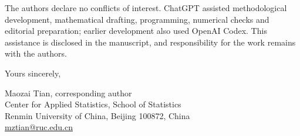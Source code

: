 \documentclass[11pt,a4paper]{article}
\begin{document}
The authors declare no conflicts of interest. ChatGPT assisted methodological development, mathematical drafting, programming, numerical checks and editorial preparation; earlier development also used OpenAI Codex. This assistance is disclosed in the manuscript, and responsibility for the work remains with the authors.

Yours sincerely,

Maozai Tian, corresponding author\\
Center for Applied Statistics, School of Statistics\\
Renmin University of China, Beijing 100872, China\\
\href{mailto:mztian@ruc.edu.cn}{mztian@ruc.edu.cn}
\end{document}
